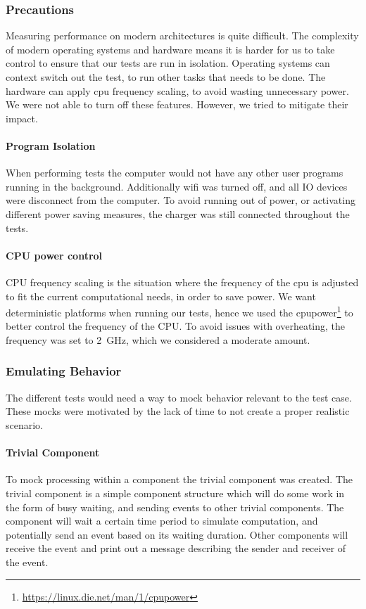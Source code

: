 \subsubsection{Precautions}
Measuring performance on modern architectures is quite difficult. The complexity of modern operating systems and hardware means
it is harder for us to take control to ensure that our tests are run in isolation.
Operating systems can context switch out the test, to run other tasks that needs to be done.
The hardware can apply cpu frequency scaling, to avoid wasting unnecessary power.
We were not able to turn off these features. However, we tried to mitigate their impact.

\paragraph{Program Isolation}
When performing tests the computer would not have any other user programs running in the background.
Additionally wifi was turned off, and all IO devices were disconnect from the computer.
To avoid running out of power, or activating different power saving measures, the charger was still connected
throughout the tests.

\paragraph{CPU power control}
CPU frequency scaling is the situation where the frequency of the cpu is adjusted to fit the current computational needs,
in order to save power.
We want deterministic platforms when running our tests, hence we used the cpupower\footnote{\url{https://linux.die.net/man/1/cpupower}}
to better control the frequency of the CPU. To avoid issues with overheating, the frequency was set to \SI{2}{\giga\hertz},
which we considered a moderate amount.

\subsubsection{Emulating Behavior}
The different tests would need a way to mock behavior relevant to the test case.
These mocks were motivated by the lack of time to not create a proper realistic scenario.

\paragraph{Trivial Component}
\label{par:test_cases_trivial_component}
To mock processing within a component the trivial component was created.
The trivial component is a simple component structure which will do some work in the form of busy waiting,
and sending events to other trivial components.
The component will wait a certain time period to simulate computation, and potentially send an event
based on its waiting duration.
Other components will receive the event and print out a message describing the sender and receiver of the event.

